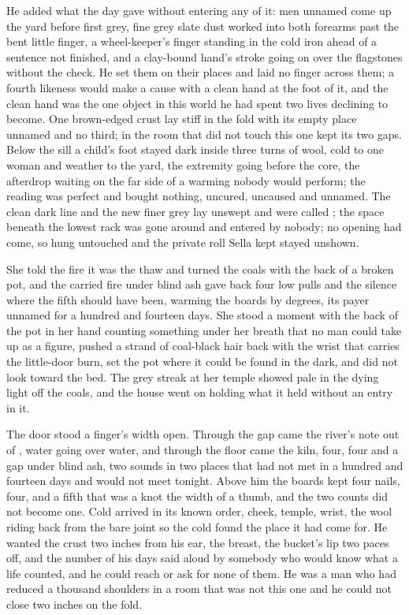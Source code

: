 He added what the day gave without entering any of it: men unnamed come up the yard before first grey, fine grey slate dust worked into both forearms past the bent little finger, a wheel-keeper's finger standing in the cold iron ahead of a sentence not finished, and a clay-bound hand's stroke going on over the flagstones without the check. He set them on their places and laid no finger across them; a fourth likeness would make a cause with a clean hand at the foot of it, and the clean hand was the one object in this world he had spent two lives declining to become. One brown-edged crust lay stiff in the fold with its empty place unnamed and no third;  in the room that did not touch this one kept its two gaps. Below the sill a child's foot stayed dark inside three turns of wool, cold to one woman and weather to the yard, the extremity going before the core, the afterdrop waiting on the far side of a warming nobody would perform; the reading was perfect and bought nothing, uncured, uncaused and unnamed. The clean dark line and the new finer grey lay unswept and were called ; the space beneath the lowest rack was gone around and entered by nobody; no opening had come, so  hung untouched and the private roll Sella kept stayed unshown.

She told the fire it was the thaw and turned the coals with the back of a broken pot, and the carried fire under blind ash gave back four low pulls and the silence where the fifth should have been, warming the boards by degrees, its payer unnamed for a hundred and fourteen days. She stood a moment with the back of the pot in her hand counting something under her breath that no man could take up as a figure, pushed a strand of coal-black hair back with the wrist that carries the little-door burn, set the pot where it could be found in the dark, and did not look toward the bed. The grey streak at her temple showed pale in the dying light off the coals, and the house went on holding what it held without an entry in it.

The door stood a finger's width open. Through the gap came the river's note out of , water going over water, and through the floor came the kiln, four, four and a gap under blind ash, two sounds in two places that had not met in a hundred and fourteen days and would not meet tonight. Above him the boards kept four nails, four, and a fifth that was a knot the width of a thumb, and the two counts did not become one. Cold arrived in its known order, cheek, temple, wrist, the wool riding back from the bare joint so the cold found the place it had come for. He wanted the crust two inches from his ear, the breast, the bucket's lip two paces off, and the number of his days said aloud by somebody who would know what a life counted, and he could reach or ask for none of them. He was a man who had reduced a thousand shoulders in a room that was not this one and he could not close two inches on the fold.

